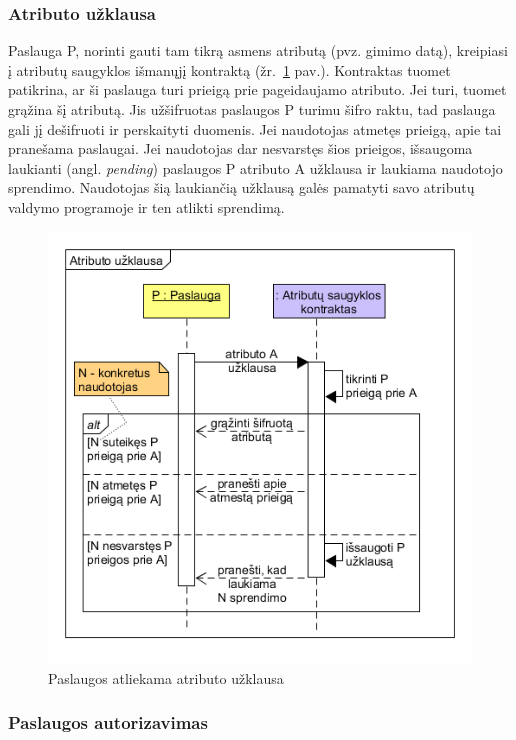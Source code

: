 \subsubsection{Atributo užklausa} \label{BCIDM:askForAttribute}

Paslauga P, norinti gauti tam tikrą asmens atributą (pvz. gimimo datą),
kreipiasi į atributų saugyklos išmanųjį kontraktą (žr.\hypertarget{fig:askForAttributeSequence}{~\ref{fig:askForAttributeSequence} pav.}).
Kontraktas tuomet patikrina, ar ši paslauga turi prieigą prie pageidaujamo atributo. Jei turi, tuomet grąžina šį atributą. Jis
užšifruotas paslaugos P turimu šifro raktu, tad paslauga gali jį dešifruoti ir perskaityti duomenis. Jei
naudotojas atmetęs prieigą, apie tai pranešama paslaugai. Jei naudotojas dar nesvarstęs šios prieigos, išsaugoma laukianti
(angl. \textit{pending}) paslaugos P atributo A užklausa ir laukiama naudotojo sprendimo. Naudotojas šią laukiančią užklausą galės pamatyti savo 
atributų valdymo programoje ir ten atlikti sprendimą.

\begin{figure}[H]
    \centering
    \includegraphics[scale=0.7]{img/askForAttributeSequence}
    \caption{Paslaugos atliekama atributo užklausa}
    \label{fig:askForAttributeSequence}
\end{figure}

\subsubsection{Paslaugos autorizavimas}

